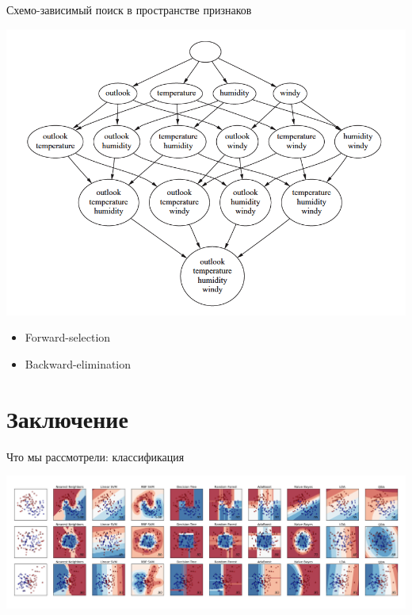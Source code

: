 \documentclass[10pt,a4paper]{beamer}
\begin{document}

\begin{frame}{Схемо-зависимый поиск в пространстве признаков}

\begin{center}
\includegraphics[scale=0.25]{images/lattice.png}
\end{center}

\begin{itemize}
\item Forward-selection
\item Backward-elimination
\end{itemize}

\end{frame}


\section{Заключение}


\begin{frame}{Что мы рассмотрели: классификация}

\begin{center}
\includegraphics[scale=0.16]{images/classification.png}
\end{center}

\end{frame}
\end{document}
